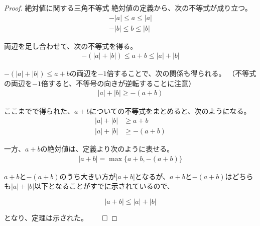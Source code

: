 \documentclass[../../math-imaging]{subfiles}
\begin{document}
\begin{proof}{絶対値に関する三角不等式}
  絶対値の定義から、次の不等式が成り立つ。
  \begin{align}
    -|a| \leq a \leq |a| \\
    -|b| \leq b \leq |b|
  \end{align}

  両辺を足し合わせて、次の不等式を得る。
  \begin{align}
    -(|a| + |b|) \leq a + b \leq |a| + |b|
  \end{align}

  $-(|a| + |b|) \leq a + b$の両辺を$-1$倍することで、次の関係も得られる。
  （不等式の両辺を$-1$倍すると、不等号の向きが逆転することに注意）
  \begin{align}
    |a| + |b| \geq -(a + b)
  \end{align}

  ここまでで得られた、$a+b$についての不等式をまとめると、次のようになる。
  \begin{align}
    |a| + |b| & \geq a+b      \\
    |a| + |b| & \geq -(a + b)
  \end{align}

  一方、$a+b$の絶対値は、定義より次のように表せる。
  \begin{align}
    |a + b| = \max\{a + b, -(a + b)\}
  \end{align}

  $a+b$と$-(a+b)$のうち大きい方が$|a+b|$となるが、$a + b$と$-(a+b)$はどちらも$|a| + |b|$以下となることがすでに示されているので、

  \begin{equation}
    |a + b| \leq |a| + |b|
  \end{equation}

  となり、定理は示された。$\qed$
\end{proof}
\end{document}
